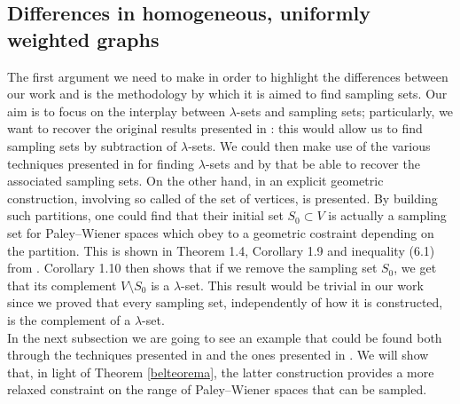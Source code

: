 \documentclass[12pt]{amsart}
\theoremstyle{definition}
\numberwithin{equation}{section}
\theoremstyle{definition}
\theoremstyle{remark}
\numberwithin{equation}{section}
\begin{document}
\subsection{Differences in homogeneous, uniformly weighted graphs}
The first argument we need to make in order to highlight the differences between our work and \cite{FP} is the methodology by which it is aimed to find sampling sets. Our aim is to focus on the interplay between $\lambda$-sets and sampling sets; particularly, we want to recover the original results presented in \cite{PW1}: this would allow us to find sampling sets by subtraction of $\lambda$-sets. We could then make use of the various techniques presented in \cite{PW1} for finding $\lambda$-sets and by that be able to recover the associated sampling sets. On the other hand, in \cite{FP} an explicit geometric construction, involving so called  of the set of vertices, is presented. By building such partitions, one could find that their initial set $S_0 \subset V$ is actually a sampling set for Paley--Wiener spaces which obey to a geometric costraint depending on the partition. This is shown in Theorem 1.4, Corollary 1.9 and inequality (6.1) from \cite{FP}. Corollary 1.10 then shows that if we remove the sampling set $S_0$, we get that its complement $V\setminus S_0$ is a $\lambda$-set. This result would be trivial in our work since we proved that every sampling set, independently of how it is constructed, is the complement of a $\lambda$-set.\\
In the next subsection we are going to see an example that could be found both through the techniques presented in \cite{FP} and the ones presented in \cite{PW1}. We will show that, in light of Theorem \ref{belteorema}, the latter construction provides a more relaxed constraint on the range of Paley--Wiener spaces that can be sampled.
\end{document}

